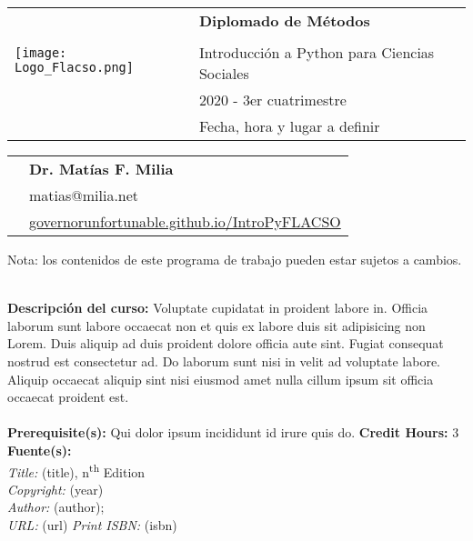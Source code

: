 \documentclass[11pt]{article}
\begin{document}
\begin{tabular}{ l l }
  \multirow{4}{*}{\texttt{[image: Logo\_Flacso.png]}} & \textcolor{AzulFlacso} {\textbf{\LARGE Diplomado de Métodos}} \\\\ & \LARGE Introducción a Python para Ciencias Sociales\\
  & \large 2020 - 3er cuatrimestre\\
 & \normalsize Fecha, hora y lugar a definir \\
\end{tabular}
\vspace{10mm}

\begin{tabular}{ l l }
  & \large \textbf{Dr. Matías F. Milia} \\
  & \large matias@milia.net \\
  & \href{https://www.governorunfortunable.github.io/IntroPyFLACSO}{governorunfortunable.github.io/IntroPyFLACSO}  \\ %
\end{tabular}
\vspace{5mm}
\begin{center} Nota: los contenidos de este programa de trabajo pueden estar sujetos a cambios. \\
\end{center}

\textbf {\large \\ Descripción del curso:} Voluptate cupidatat in proident labore in. Officia laborum sunt labore occaecat non et quis ex labore duis sit adipisicing non Lorem. Duis aliquip ad duis proident dolore officia aute sint. Fugiat consequat nostrud est consectetur ad. Do laborum sunt nisi in velit ad voluptate labore. Aliquip occaecat aliquip sint nisi eiusmod amet nulla cillum ipsum sit officia occaecat proident est.  \\\\
\textbf {Prerequisite(s):} Qui dolor ipsum incididunt id irure quis do.
\textbf {Credit Hours:} 3 \\

\textbf {\large Fuente(s):} \\

\emph{Title:} (title), n\textsuperscript{th} Edition \\
\emph {Copyright:} (year) \\
\emph {Author:} (author);\\
\emph {URL:} (url)
\emph {Print ISBN:} (isbn)\\
\end{document}
